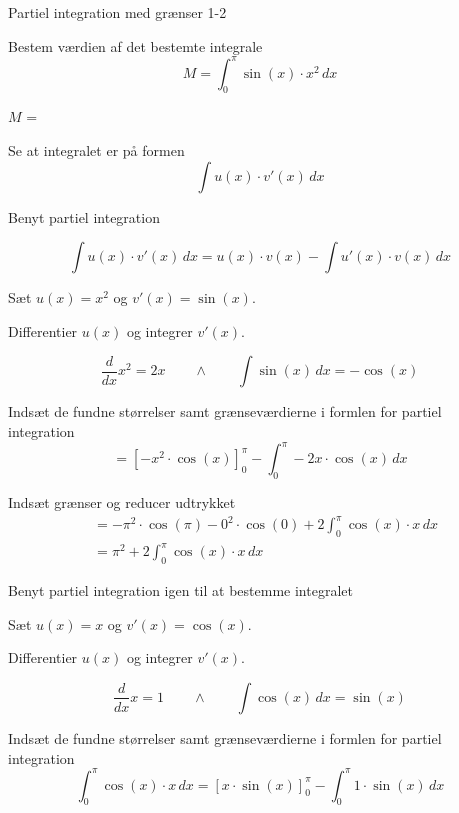\documentclass{article}
\begin{document}
\begin{exercise}{Partiel integration med grænser 1-2}
	
	
	Bestem værdien af det bestemte integrale
	\[
	M = \int_0^\pi \sin(x) \cdot x^2 \, dx
	\]
	
	$M$ =  
	
	
	\hint
	
	Se at integralet er på formen
	\[
	\int u(x) \cdot v'(x) \, dx
	\]
	
	\hint
	
	Benyt partiel integration
	
	\hint
	\[
	\int u(x) \cdot v'(x)\, dx = u(x) \cdot v(x) - \int u'(x) \cdot v(x) \, dx
	\]
	
	\hint
	
	Sæt $u(x) = x^2$ og $v'(x) = \sin(x)$.
	
	
	\hint
	
	Differentier $u(x)$ og integrer $v'(x)$.
	
	\hint
	\[
	\frac{d}{dx}x^2 = 2x \qquad \wedge \qquad \int \sin(x) \, dx = -\cos(x)
	\]
	
	\hint
	
	Indsæt de fundne størrelser samt grænseværdierne i formlen for partiel integration 
	\[
	= \left[-x^2 \cdot \cos(x) \right]_{0}^{\pi} - \int_{0}^{\pi} -2x \cdot \cos(x)  \, dx
	\]
	
	\hint
	
	Indsæt grænser og reducer udtrykket
	\begin{align*}
	&= -\pi^2 \cdot \cos(\pi) - 0^2 \cdot \cos(0)   + 2 \int_{0}^{\pi} \cos(x) \cdot x  \, dx \\
	&= \pi^2 + 2  \int_{0}^{\pi} \cos(x) \cdot x  \, dx
	\end{align*}
	
	\hint 
	Benyt partiel integration igen til at bestemme integralet

	
	\hint
	
	Sæt $u(x) = x$ og $v'(x) = \cos(x)$.
	
	
	\hint
	
	Differentier $u(x)$ og integrer $v'(x)$.
	
	\hint
	\[
	\frac{d}{dx}x = 1 \qquad \wedge \qquad \int \cos(x) \, dx = \sin(x)
	\]
	
	\hint
	
	Indsæt de fundne størrelser samt grænseværdierne i formlen for partiel integration 
	\[
	\int_{0}^{\pi} \cos(x) \cdot x  \, dx = \left[ x \cdot \sin(x) \right]_0^\pi - \int_0^\pi 1 \cdot \sin(x) \, dx
	\]
	

\end{exercise}
\end{document}

